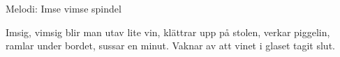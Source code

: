 \begin{song}

\begin{songmeta}
Melodi: Imse vimse spindel
\end{songmeta}

\begin{songtext}
Imsig, vimsig blir man utav lite vin,
klättrar upp på stolen, verkar piggelin,
ramlar under bordet, sussar en minut.
Vaknar av att vinet i glaset tagit slut.
\end{songtext}
\end{song}
